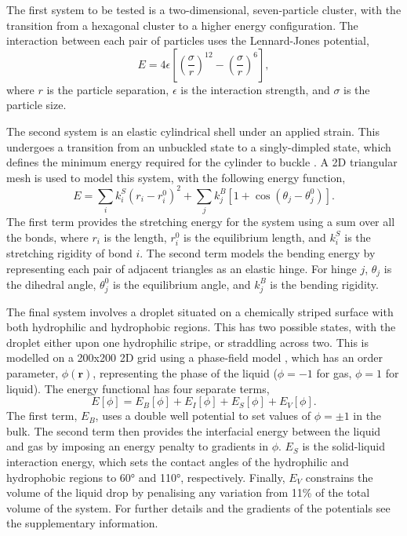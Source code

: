\documentclass[aps,prl,twocolumn,groupedaddress]{revtex4}
\begin{document}
\topic The first system to be tested is a two-dimensional, seven-particle cluster, with the transition from a hexagonal cluster to a higher energy configuration.
The interaction between each pair of particles uses the Lennard-Jones potential,
\begin{equation}
  E = 4\epsilon \left[ \left(\frac{\sigma}{r}\right)^{12} - \left(\frac{\sigma}{r}\right)^6 \right],
\end{equation}
where $r$ is the particle separation, $\epsilon$ is the interaction strength, and $\sigma$ is the particle size.

\topic The second system is an elastic cylindrical shell under an applied strain.
This undergoes a transition from an unbuckled state to a singly-dimpled state, which defines the minimum energy required for the cylinder to buckle \cite{Panter2019}.
A 2D triangular mesh is used to model this system, with the following energy function,
\begin{equation}
  E = \sum_i k^S_i (r_i - r^0_i)^2 + \sum_j k^B_j [1 + \cos(\theta_j - \theta^0_j)].
\end{equation}
The first term provides the stretching energy for the system using a sum over all the bonds, where $r_i$ is the length, $r^0_i$ is the equilibrium length, and $k^S_i$ is the stretching rigidity of bond $i$.
The second term models the bending energy by representing each pair of adjacent triangles as an elastic hinge.
For hinge $j$, $\theta_j$ is the dihedral angle, $\theta^0_j$ is the equilibrium angle, and $k^B_j$ is the bending rigidity.

\topic The final system involves a droplet situated on a chemically striped surface with both hydrophilic and hydrophobic regions.
This has two possible states, with the droplet either upon one hydrophilic stripe, or straddling across two.
This is modelled on a 200x200 2D grid using a phase-field model \cite{Panter2019b}, which has an order parameter, $\phi(\bm{r})$, representing the phase of the liquid ($\phi=-1$ for gas, $\phi=1$ for liquid).
The energy functional has four separate terms,
\begin{equation} \label{eq:phasefield}
  E[\phi] = E_B[\phi] + E_I[\phi] + E_S[\phi] + E_V[\phi].
\end{equation}
The first term, $E_B$, uses a double well potential to set values of $\phi=\pm1$ in the bulk.
The second term then provides the interfacial energy between the liquid and gas by imposing an energy penalty to gradients in $\phi$.
$E_S$ is the solid-liquid interaction energy, which sets the contact angles of the hydrophilic and hydrophobic regions to 60\si{\degree} and 110\si{\degree}, respectively.
Finally, $E_V$ constrains the volume of the liquid drop by penalising any variation from 11\% of the total volume of the system.
For further details and the gradients of the potentials see the supplementary information.
\end{document}
